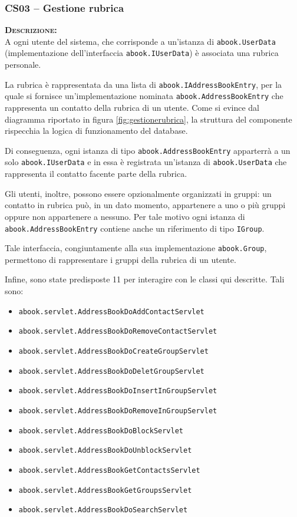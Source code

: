 \subsubsection{CS03 -- Gestione rubrica}\label{sec:cs03}
\begin{description}
	\item{\scshape\bfseries Descrizione:}\\
A ogni utente del sistema, che corrisponde a un'istanza di \texttt{abook.UserData} (implementazione dell'interfaccia \texttt{abook.IUserData}) è associata una rubrica personale. 

La rubrica è rappresentata da una lista di \texttt{abook.IAddressBookEntry}, per la quale si fornisce un'implementazione nominata \texttt{abook.AddressBookEntry} che rappresenta un contatto della rubrica di un utente. Come si evince dal diagramma riportato in figura \ref{fig:gestionerubrica}, la struttura del componente rispecchia la logica di funzionamento del database.

Di conseguenza, ogni istanza di tipo \texttt{abook.AddressBookEntry} apparterrà a un solo \texttt{abook.IUserData} e in essa è registrata un'istanza di \texttt{abook.UserData} che rappresenta il contatto facente parte della rubrica.

Gli utenti, inoltre, possono essere opzionalmente organizzati in gruppi: un contatto in rubrica può, in un dato momento, appartenere a uno o più gruppi oppure non appartenere a nessuno. Per tale motivo ogni istanza di \texttt{abook.AddressBookEntry} contiene anche un riferimento di tipo \texttt{IGroup}.

Tale interfaccia, congiuntamente alla sua implementazione \texttt{abook.Group}, permettono di rappresentare i gruppi della rubrica di un utente.

Infine, sono state predisposte 11  per interagire con le classi qui descritte. Tali sono:

\begin{itemize}
	\item \texttt{abook.servlet.AddressBookDoAddContactServlet}
	\item \texttt{abook.servlet.AddressBookDoRemoveContactServlet}
	\item \texttt{abook.servlet.AddressBookDoCreateGroupServlet}
	\item \texttt{abook.servlet.AddressBookDoDeletGroupServlet}
	\item \texttt{abook.servlet.AddressBookDoInsertInGroupServlet}
	\item \texttt{abook.servlet.AddressBookDoRemoveInGroupServlet}
	\item \texttt{abook.servlet.AddressBookDoBlockServlet}
	\item \texttt{abook.servlet.AddressBookDoUnblockServlet}
	\item \texttt{abook.servlet.AddressBookGetContactsServlet}
	\item \texttt{abook.servlet.AddressBookGetGroupsServlet}
	\item \texttt{abook.servlet.AddressBookDoSearchServlet}
\end{itemize}


\end{description}
